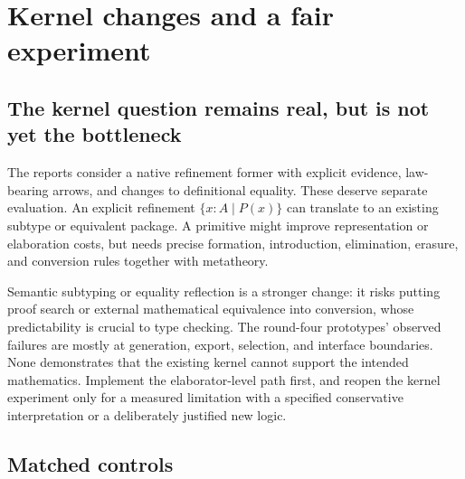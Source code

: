 \documentclass[11pt,letterpaper]{article}
\theoremstyle{definition}\newtheorem{definition}[proposition]{Definition}
\theoremstyle{remark}\newtheorem{remark}[proposition]{Remark}
\begin{document}
\section{Kernel changes and a fair experiment}
\label{sec:evaluation}

\subsection{The kernel question remains real, but is not yet the bottleneck}

The reports consider a native refinement former with explicit evidence,
law-bearing arrows, and changes to definitional equality. These deserve
separate evaluation. An explicit refinement $\{x:A\mid P(x)\}$ can translate
to an existing subtype or equivalent package. A primitive might improve
representation or elaboration costs, but needs precise formation, introduction,
elimination, erasure, and conversion rules together with metatheory.

Semantic subtyping or equality reflection is a stronger change: it risks
putting proof search or external mathematical equivalence into conversion,
whose predictability is crucial to type checking. The round-four prototypes'
observed failures are mostly at generation, export, selection, and interface
boundaries. None demonstrates that the existing kernel cannot support the
intended mathematics. Implement the elaborator-level path first, and reopen
the kernel experiment only for a measured limitation with a specified
conservative interpretation or a deliberately justified new logic.

\subsection{Matched controls}
\end{document}
